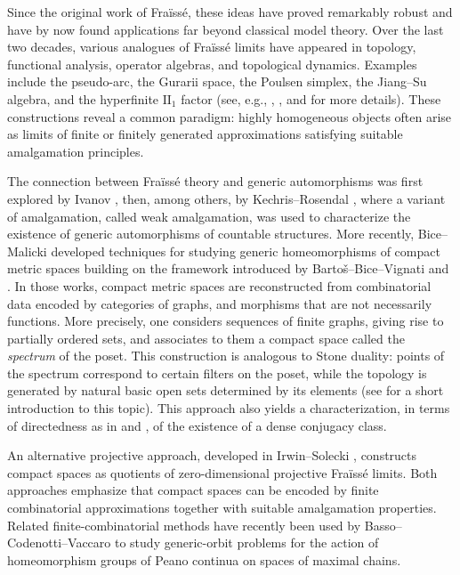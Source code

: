 \documentclass[12pt]{amsart}
\numberwithin{equation}{section}
\theoremstyle{plain}
\theoremstyle{definition}
\begin{document}
Since the original work of Fra\"iss\'e, these ideas have proved remarkably robust and have by now found applications far beyond classical model theory. Over the last two decades, various analogues of Fra\"iss\'e limits have appeared in topology, functional analysis, operator algebras, and topological dynamics. Examples include the pseudo-arc, the Gurarii space, the Poulsen simplex, the Jiang--Su algebra, and the hyperfinite $\mbox{II}_1$ factor (see, e.g., \cite{IrSo}, \cite{Lu}, and \cite{EaFa} for more details). These constructions reveal a common paradigm: highly homogeneous objects often arise as limits of finite or finitely generated approximations satisfying suitable amalgamation principles.

The connection between Fra\"iss\'e theory and generic automorphisms was first explored by Ivanov \cite{Iv}, then, among others, by Kechris--Rosendal \cite{KeRo}, where a variant of amalgamation, called weak amalgamation, was used to characterize the existence of generic automorphisms of countable structures. More recently, Bice--Malicki \cite{BiMa} developed techniques for studying generic homeomorphisms of compact metric spaces building on the framework introduced by Barto\v s--Bice--Vignati \cite{BaBiVi} and \cite{BaBiVi2}. In those works, compact metric spaces are reconstructed from combinatorial data encoded by categories of graphs, and morphisms that are not necessarily functions. More precisely, one considers sequences of finite graphs, giving rise to partially ordered sets, and associates to them a compact space called the \emph{spectrum} of the poset. This construction is analogous to Stone duality: points of the spectrum correspond to certain filters on the poset, while the topology is generated by natural basic open sets determined by its elements (see \cite[Section 3]{Ma} for a short introduction to this topic). This approach also yields a characterization, in terms of directedness as in \cite{KeRo} and \cite{BiMa}, of the existence of a dense conjugacy class.

An alternative projective approach, developed in Irwin--Solecki \cite{IrSo}, constructs compact spaces as quotients of zero-dimensional projective Fra\"iss\'e limits. Both approaches emphasize that compact spaces can be encoded by finite combinatorial approximations together with suitable amalgamation properties. Related finite-combinatorial methods have recently been used by Basso--Codenotti--Vaccaro \cite{BaCoVa} to study generic-orbit problems for the action of homeomorphism groups of Peano continua on spaces of maximal chains.
\end{document}
